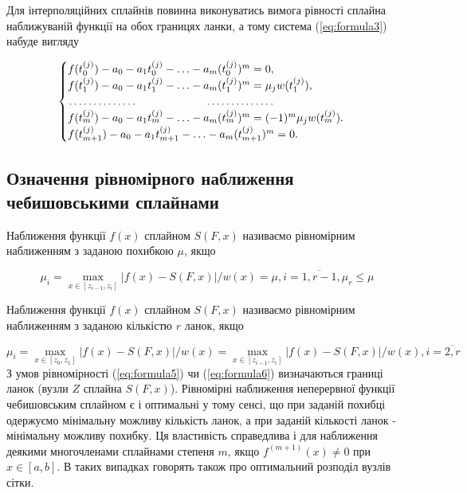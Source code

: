 \documentclass[ukrainian,14pt]{extarticle}
\begin{document}
Для інтерполяційних сплайнів повинна виконуватись вимога рівності сплайна наближуваній функції на обох границях ланки, а тому система (\ref{eq:formula3}) набуде вигляду 

\begin{equation}\label{eq:formula_system7}
\begin{cases}
f(t^{(j)}_0) - a_0 - a_1t^{(j)}_0 - \ldots - a_m(t_0^{(j)})^m = 0, \\
f(t^{(j)}_1)-a_0-a_1t^{(j)}_1 - \ldots - a_m(t^{(j)}_1)^m = \mu_jw(t^{(j)}_1),\\
\dotfill\hfill\hbox{} \dotfill\hfill\hbox{}\\
f(t^{(j)}_{m}) - a_0 - a_1t^{(j)}_{m} - \ldots - a_m(t^{(j)}_{m})^m = (-1)^{m}\mu_jw(t^{(j)}_{m}). \\
f(t^{(j)}_{m+1}) - a_0 - a_1t^{(j)}_{m+1} - \ldots - a_m(t^{(j)}_{m+1})^m = 0.
\end{cases}
\end{equation}

\subsection{Означення рівномірного наближення чебишовськими сплайнами}

Наближення функції $f(x)$ сплайном $S(F, x)$ називаємо рівномірним наближенням з заданою похибкою $\mu$, якщо

\begin{equation}\label{eq:formula5}
\mu_i = \max_{x \in [z_{i-1}, z_i]} |f(x) - S(F, x)|/ w(x) = \mu, i = \overline{1, r-1}, \mu_r \leq \mu
\end{equation}

Наближення функції $f(x)$ сплайном $S(F, x)$ називаємо рівномірним наближенням з заданою кількістю $r$ ланок, якщо

\begin{equation}\label{eq:formula6}
\mu_i = \max_{x \in [z_0, z_1]} |f(x) - S(F, x)|/w(x) = \max_{x \in [z_{i-1}, z_i]} |f(x) - S(F, x)|/w(x), i = \overline{2, r}
\end{equation}
З умов рівномірності (\ref{eq:formula5}) чи (\ref{eq:formula6}) визначаються границі ланок (вузли $Z$ сплайна $S(F, x)$). Рівномірні наближення неперервної функції чебишовським сплайном є і оптимальні у тому сенсі, що при заданій похибці одержуємо мінімальну можливу кількість ланок, а при заданій кількості ланок - мінімальну можливу похибку. Ця властивість справедлива і для наближення деякими многочленами сплайнами степеня $m$, якщо $f^{(m+1)}(x) \neq 0$ при $x \in [a, b]$. В таких випадках говорять також про оптимальний розподіл вузлів сітки.
\end{document}
